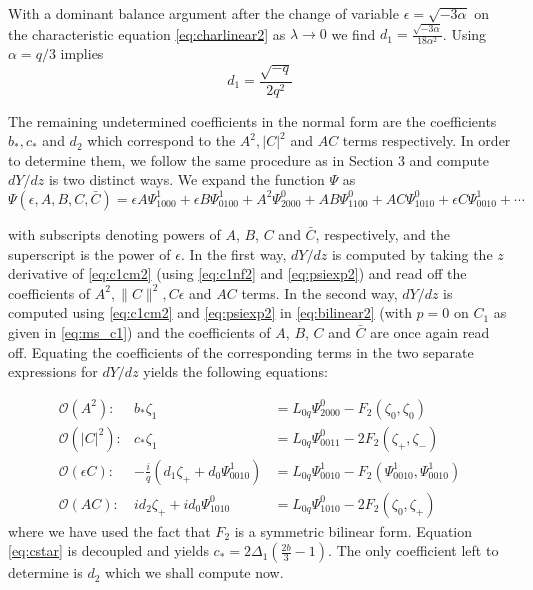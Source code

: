 With a dominant balance argument after the change of variable $\epsilon =
\sqrt{-3 \alpha}$ on the characteristic equation \eqref{eq:charlinear2} as $\lambda \rightarrow 0 $ we
find $d_1 = \frac{ \sqrt{-3 \alpha} }{18 \alpha^2 } $. Using $\alpha=q/3$
implies 
\begin{equation}
d_1 = \frac{\sqrt{-q}}{2 q^2}
\end{equation}

The remaining undetermined coefficients  in the normal form are the 
coefficients $b_*,c_*$ and $d_2$ 
which correspond to the $A^2, |C|^2$ and $AC$ terms respectively. In 
order to determine them, we follow the same procedure as 
in Section 3 and compute $dY/dz$ is two distinct ways. We expand the
function $\Psi$ as
\begin{equation}\label{eq:psiexp2}
\Psi(\epsilon,A,B,C,\bar{C}) = \epsilon A \Psi_{1000}^1 + \epsilon B \Psi_{0100}^1 + A^2 \Psi_{2000}^0 + A B \Psi_{1100}^0 + A C \Psi_{1010}^0 + \epsilon C \Psi_{0010}^1 + \cdots 
\end{equation}

with subscripts denoting powers of $A$, $B$, $C$ and $\bar{C}$, respectively,
and the superscript is the power of $\epsilon$. In the first way, $dY/dz$ is
computed by taking the $z$ derivative of \eqref{eq:c1cm2} (using \eqref{eq:c1nf2}
and \eqref{eq:psiexp2}) and read off the coefficients of $A^2, \|C\|^2, C
\epsilon$ and $AC$ terms.  In the second way, $dY/dz$ is computed using
\eqref{eq:c1cm2} and \eqref{eq:psiexp2} in \eqref{eq:bilinear2} (with $p=0$ on
$C_1$ as given in \eqref{eq:ms_c1}) and the coefficients of  $A$, $B$, $C$ and
$\bar{C}$ are once again read off.  Equating the coefficients of the
corresponding terms in the two separate expressions for $dY/dz$ yields the
following equations:

\begin{subequations}
\begin{eqnarray}
\mathcal{O}(A^2): &		b_* \zeta_1 &= L_{0q} \Psi_{2000}^0 - F_2(\zeta_0,\zeta_0) \\
\mathcal{O}(\left|C\right|^2):&	c_* \zeta_1 &= L_{0q} \Psi_{0011}^0 -2 F_2(\zeta_+,\zeta_-) \label{eq:cstar2} \\
\mathcal{O}(\epsilon C): &-\frac{i}{q} \left(d_1 \zeta_+ +  d_0 \Psi_{0010}^1\right) &= L_{0q} \Psi_{0010}^1 - F_2(\Psi_{0010}^1,\Psi_{0010}^1) \\
\mathcal{O}(A C): 	&i d_2 \zeta_+ + i d_0 \Psi_{1010}^0 &= L_{0q} \Psi_{1010}^0 - 2 F_2(\zeta_0,\zeta_+) \label{eq:AC2}
\end{eqnarray}
\end{subequations}
where we have used the fact that $F_2$ is a symmetric bilinear form. Equation \eqref{eq:cstar} is decoupled and yields 
$ c_* = 2 \Delta_1 \left( \frac{2 b}{3}  - 1\right)$. The only coefficient left to determine is $d_2$ which we shall compute now. 

